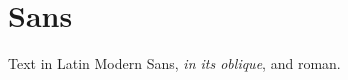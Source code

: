 \documentclass{article}
\begin{document}
\section{Sans}
Text in Latin Modern Sans, \emph{in its oblique}, and \textrm{roman}.
\end{document}
